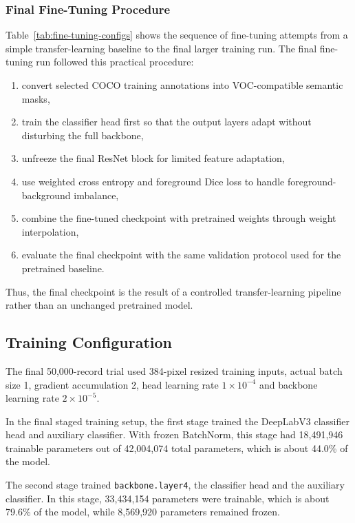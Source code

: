 \documentclass[9pt,a4paper,oneside]{rho-class/rho}
\begin{document}
\subsubsection{Final Fine-Tuning Procedure}

    Table~\ref{tab:fine-tuning-configs} shows the sequence of fine-tuning attempts from a simple transfer-learning baseline to the final larger training run. The final fine-tuning run followed this practical procedure:

    \begin{enumerate}
        \item convert selected COCO training annotations into VOC-compatible semantic masks,
        \item train the classifier head first so that the output layers adapt without disturbing the full backbone,
        \item unfreeze the final ResNet block for limited feature adaptation,
        \item use weighted cross entropy and foreground Dice loss to handle foreground-background imbalance,
        \item combine the fine-tuned checkpoint with pretrained weights through weight interpolation,
        \item evaluate the final checkpoint with the same validation protocol used for the pretrained baseline.
    \end{enumerate}

    Thus, the final checkpoint is the result of a controlled transfer-learning pipeline rather than an unchanged pretrained model.

\subsection{Training Configuration}

    The final 50,000-record trial used 384-pixel resized training inputs, actual batch size 1, gradient accumulation 2, head learning rate \(1 \times 10^{-4}\) and backbone learning rate \(2 \times 10^{-5}\).

    In the final staged training setup, the first stage trained the DeepLabV3 classifier head and auxiliary classifier. With frozen BatchNorm, this stage had 18,491,946 trainable parameters out of 42,004,074 total parameters, which is about 44.0\% of the model.

    The second stage trained \texttt{backbone.layer4}, the classifier head and the auxiliary classifier. In this stage, 33,434,154 parameters were trainable, which is about 79.6\% of the model, while 8,569,920 parameters remained frozen.
\end{document}
